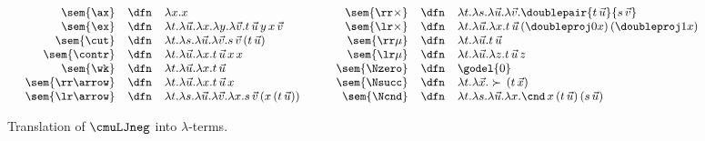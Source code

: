 \begin{figure}[t]
    \centering
   \[
   \small
   \begin{array}{rcl}
       \sem{\ax}& \dfn& \lambda x.x \\
        \sem{\ex}&\dfn &\lambda t. \lambda \vec u. \lambda x. \lambda y. \lambda \vec v. t\, \vec u \,y\,x\, \vec v \\
  \sem{\cut}&\dfn &\lambda t. \lambda s. \lambda \vec{u}.\lambda \vec v. s\, \vec v \, (t \,\vec u)  \\ 
  \sem{\contr}&\dfn &\lambda t. \lambda \vec u. \lambda x. t\,\vec u \,x\,x\\ 
  \sem{\wk}&\dfn &\lambda t. \lambda \vec u. \lambda x. t \,\vec u  \\
   \sem{\rr \arrow}&\dfn& \lambda t. \lambda \vec u. \lambda x. t \,\vec u\, x\\  
   \sem{\lr \arrow}&\dfn& \lambda t. \lambda s. \lambda \vec u. \lambda \vec v. \lambda x.  s\,\vec v\,(x\,(t\,\vec u))\\
   \end{array}
   \qquad
   \begin{array}{rcl}
         \sem{\rr \times }& \dfn&  \lambda t. \lambda s. \lambda \vec{u}.\lambda \vec v . \doublepair {t\, \vec u}{s \, \vec v} \\
  \sem{\lr \times}&\dfn &\lambda t. \lambda \vec u. \lambda x. {t\,  \vec u \, (\doubleproj0 x) \, (\doubleproj1 x)}  
\\
\sem{\rr \mu}&\dfn &\lambda t. \lambda \vec{u}. t\, \vec u \\
  \sem{\lr \mu}&\dfn& \lambda t. \lambda \vec{u}. \lambda z. t \, \vec u \, z  \\ 
  \sem{\Nzero}&\dfn & \godel{0}\\
  \sem{\Nsucc}&\dfn& \lambda t.\lambda \vec x. \succ \, {(t\, \vec x)}\\
  \sem{\Ncnd} &\dfn & \lambda t. \lambda s. \lambda \vec u. \lambda x. \cnd\, {x}\, {(t \, \vec u)}\, {(s\, \vec u)}
   \end{array}
   \]
    \caption{Translation of  $\cmuLJneg$ into $\lambda$-terms.}
    \label{fig:translation-of-rules}
\end{figure}




